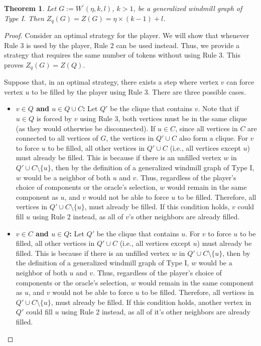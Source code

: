 \documentclass[11pt]{article}
\theoremstyle{plain}
\newtheorem{theorem}{Theorem}[section]
\theoremstyle{definition}
\theoremstyle{remark}
\begin{document}


\begin{theorem} \label{Theorem: windmill I}
    Let $ G := W^{\prime}(\eta, k, l) $, $k>1$, be a generalized windmill graph of Type I. Then $ Z_q(G) = Z(G) = \eta \times (k-1) + l$.
\end{theorem}

\begin{proof}
    Consider an optimal strategy for the player. We will show that whenever Rule 3 is used by the player, Rule 2 can be used instead. Thus, we provide a strategy that requires the same number of tokens without using Rule 3. This proves $Z_q(G) = Z(Q)$.

    Suppose that, in an optimal strategy, there exists a step where vertex $ v $ can force vertex $ u $ to be filled by the player using Rule 3. There are three possible cases.
    \begin{itemize}
        \item \textbf{$v \in Q$ and $u \in Q \cup C$:} Let $ Q' $ be the clique that contains $ v $. Note that if $ u \in Q $ is forced by $ v $ using Rule 3, both vertices must be in the same clique (as they would otherwise be disconnected). If $ u \in C $, since all vertices in $ C $ are connected to all vertices of $ G $, the vertices in $ Q' \cup C $ also form a clique. For $ v $ to force $ u $ to be filled, all other vertices in $ Q' \cup C $ (i.e., all vertices except $ u $) must already be filled. This is because if there is an unfilled vertex $ w $ in $ Q' \cup C  \setminus \{u\}$, then by the definition of a generalized windmill graph of Type I, $ w $ would be a neighbor of both $ u $ and $ v $. Thus, regardless of the player’s choice of components or the oracle’s selection, $ w $ would remain in the same component as $ u $, and $ v $ would not be able to force $ u $ to be filled. Therefore, all vertices in $ Q' \cup C \setminus \{u\} $, must already be filled. If this condition holds, $ v $ could fill $ u $ using Rule 2 instead, as all of $v$’s other neighbors are already filled.

        \item \textbf{$v \in C$ and $u \in Q$:} Let $ Q' $ be the clique that contains $u$. For $ v $ to force $ u $ to be filled, all other vertices in $ Q' \cup C $ (i.e., all vertices except $ u $) must already be filled. This is because if there is an unfilled vertex $ w $ in $ Q' \cup C  \setminus \{u\}$, then by the definition of a generalized windmill graph of Type I, $ w $ would be a neighbor of both $ u $ and $ v $. Thus, regardless of the player’s choice of components or the oracle’s selection, $ w $ would remain in the same component as $ u $, and $ v $ would not be able to force $ u $ to be filled. Therefore, all vertices in $ Q' \cup C \setminus \{u\} $, must already be filled. If this condition holds, another vertex in $Q'$ could fill $ u $ using Rule 2 instead, as all of it’s other neighbors are already filled.


\end{itemize}
\end{proof}
\end{document}
